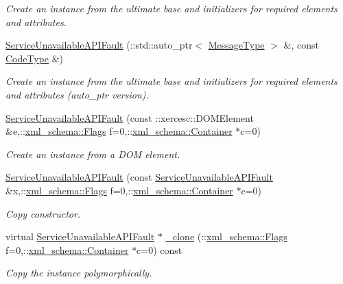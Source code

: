 \begin{DoxyCompactItemize}
\begin{DoxyCompactList}\small\item\em Create an instance from the ultimate base and initializers for required elements and attributes. \item\end{DoxyCompactList}\item 
\hyperlink{classopenstack_1_1xml_1_1ServiceUnavailableAPIFault_a2511d04aaaedcd48ee59629ef61663fc}{ServiceUnavailableAPIFault} (::std::auto\_\-ptr$<$ \hyperlink{classopenstack_1_1xml_1_1CloudServersAPIFault_aff7b9d2067747fa033a0ea4408011af6}{MessageType} $>$ \&, const \hyperlink{classopenstack_1_1xml_1_1CloudServersAPIFault_aa9f350c9dba08ae375b2a61568551550}{CodeType} \&)
\begin{DoxyCompactList}\small\item\em Create an instance from the ultimate base and initializers for required elements and attributes (auto\_\-ptr version). \item\end{DoxyCompactList}\item 
\hyperlink{classopenstack_1_1xml_1_1ServiceUnavailableAPIFault_ae83e0eabef0a87d846bca33e7269e648}{ServiceUnavailableAPIFault} (const ::xercesc::DOMElement \&e,::\hyperlink{namespacexml__schema_affb4c227cbd9aa7453dd1dc5a1401943}{xml\_\-schema::Flags} f=0,::\hyperlink{namespacexml__schema_a333dea2213742aea47a37532dec4ec27}{xml\_\-schema::Container} $\ast$c=0)
\begin{DoxyCompactList}\small\item\em Create an instance from a DOM element. \item\end{DoxyCompactList}\item 
\hyperlink{classopenstack_1_1xml_1_1ServiceUnavailableAPIFault_a9a2c672839a416e2654e17c8d2606667}{ServiceUnavailableAPIFault} (const \hyperlink{classopenstack_1_1xml_1_1ServiceUnavailableAPIFault}{ServiceUnavailableAPIFault} \&x,::\hyperlink{namespacexml__schema_affb4c227cbd9aa7453dd1dc5a1401943}{xml\_\-schema::Flags} f=0,::\hyperlink{namespacexml__schema_a333dea2213742aea47a37532dec4ec27}{xml\_\-schema::Container} $\ast$c=0)
\begin{DoxyCompactList}\small\item\em Copy constructor. \item\end{DoxyCompactList}\item 
virtual \hyperlink{classopenstack_1_1xml_1_1ServiceUnavailableAPIFault}{ServiceUnavailableAPIFault} $\ast$ \hyperlink{classopenstack_1_1xml_1_1ServiceUnavailableAPIFault_a5b12c5efc11198d03a61de7a82d8ff13}{\_\-clone} (::\hyperlink{namespacexml__schema_affb4c227cbd9aa7453dd1dc5a1401943}{xml\_\-schema::Flags} f=0,::\hyperlink{namespacexml__schema_a333dea2213742aea47a37532dec4ec27}{xml\_\-schema::Container} $\ast$c=0) const 
\begin{DoxyCompactList}\small\item\em Copy the instance polymorphically. \item\end{DoxyCompactList}\end{DoxyCompactItemize}


